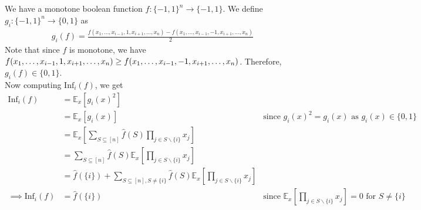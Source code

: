 \documentclass{article}
\begin{document}
\subsection{}
\vspace*{-8mm}

We have a monotone boolean function $f : {\{-1, 1\}}^n \rightarrow \{-1, 1\}$. We define $g_i : {\{-1, 1\}}^n \rightarrow \{0, 1\}$ as
\begin{align*}
	g_i(f) = \frac{f(x_1, \ldots, x_{i-1}, 1, x_{i+1}, \ldots, x_n) - f(x_1, \ldots, x_{i-1}, -1, x_{i+1}, \ldots, x_n)}{2}
\end{align*}
Note that since $f$ is monotone, we have $f(x_1, \ldots, x_{i-1}, 1, x_{i+1}, \ldots, x_n) \geq\\ f(x_1, \ldots, x_{i-1}, -1, x_{i+1}, \ldots, x_n)$. Therefore, $g_i(f) \in \{0, 1\}$. \\

\noindent
Now computing $\text{Inf}_i(f)$, we get
\begin{align*}
	\text{Inf}_i(f) &= \mathbb{E}_x[g_i(x)^2] \\
	&= \mathbb{E}_x[g_i(x)] &\text{since } {g_i(x)}^2 = g_i(x) \text{ as } g_i(x) \in \{0, 1\} \\
	&= \mathbb{E}_x \left[\sum_{S\subseteq [n]} \widehat{f}(S) \prod_{j \in S\backslash \{i\}} x_j \right] \\
	&= \sum_{S\subseteq [n]} \widehat{f}(S) \mathbb{E}_x \left[\prod_{j \in S\backslash \{i\}} x_j \right] \\
	&= \widehat{f}(\{i\}) + \sum_{S\subseteq [n], S \neq \{i\}} \widehat{f}(S) \mathbb{E}_x \left[\prod_{j \in S\backslash \{i\}} x_j \right] \\
\implies \text{Inf}_i(f) &= \boxed{\widehat{f}(\{i\})} & \text{since } \mathbb{E}_x \left[\prod_{j \in S\backslash \{i\}} x_j \right] = 0 \text{ for } S \neq \{i\} \\
\end{align*}
\vspace*{-16mm}\begin{flushright}\qedsymbol\end{flushright}
\end{document}
